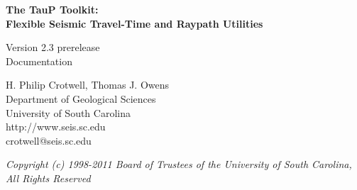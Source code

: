 
\begin{titlepage}
\begin{center}

\vspace{2in}

\LARGE
\textbf{
The TauP Toolkit: \\
Flexible Seismic Travel-Time and Raypath Utilities \\
}

\large
Version 2.3 prerelease\\
Documentation 

\vspace{3in}

H. Philip Crotwell, Thomas J. Owens \\
Department of Geological Sciences \\
University of South Carolina \\
http://www.seis.sc.edu \\
crotwell@seis.sc.edu 

\vspace{3in}

\textit{
\normalsize 
Copyright (c) 1998-2011 Board of Trustees of the University of South Carolina, \\
All Rights Reserved
\normalsize}

\end{center}
\end{titlepage}
